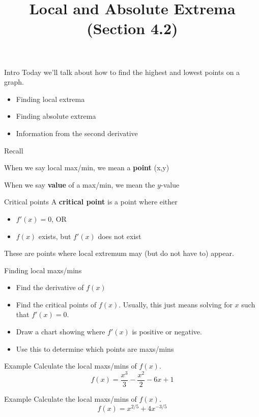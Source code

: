 \documentclass[t]{beamer}
\title{Local and Absolute Extrema (Section 4.2)}
\date{}
\newenvironment{fpi}
  {\itemize[nolistsep,itemsep=\fill]}
  {\vfill\enditemize}
\begin{document}
\frame{\titlepage}

\begin{frame}{Intro}
Today we'll talk about how to find the highest and lowest points on a graph.
\begin{itemize}
\item Finding local extrema 
\item Finding absolute extrema 
\item Information from the second derivative 
\end{itemize}
\end{frame}

\begin{frame}{Recall}
\begin{fpi}
\item When we say local max/min, we mean a \textbf{point} (x,y)
\item When we say \textbf{value} of a max/min, we mean the $y$-value
\end{fpi}
\end{frame}

\begin{frame}{Critical points}
A \textbf{critical point} is a point where either
\begin{itemize}
\item $f'(x) = 0$, OR
\item $f(x)$ exists, but $f'(x)$ does not exist
\end{itemize}
These are points where local extremum may (but do not have to) appear.
\end{frame}


\begin{frame}{Finding local maxs/mins}
\begin{itemize}
\item Find the derivative of $f(x)$
\item Find the critical points of $f(x)$.  Usually, this just means
solving for $x$ such that $f'(x) = 0$.
\item Draw a chart showing where $f'(x)$ is positive or negative.
\item Use this to determine which points are maxs/mins
\end{itemize}
\end{frame}

\begin{frame}{Example}
Calculate the local maxs/mins of $f(x)$.
$$f(x) = \frac{x^3}{3} - \frac{x^2}{2} - 6x + 1 $$
\end{frame}

\begin{frame}{Example}
Calculate the local maxs/mins of $f(x)$.
$$f(x) = x^{2/5} + 4 x^{-3/5}$$
\end{frame}
\end{document}
